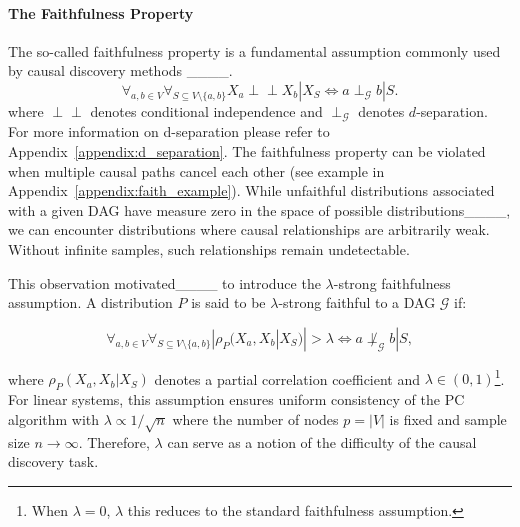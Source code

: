 \paragraph{The Faithfulness Property} 
The so-called faithfulness property is a fundamental assumption commonly used by causal discovery methods ____. 
\begin{equation}
    \forall_{a,b \in V} \forall_{S \subseteq V \setminus \{a ,b\}}X_a \perp\!\!\!\perp X_b | X_S \iff a \perp_\mathcal{G} b | S.
\end{equation}
where  $\perp\!\!\!\perp$ denotes conditional independence and $\perp_\mathcal{G}$ denotes $d$-separation. For more information on d-separation please refer to Appendix~\ref{appendix:d_separation}.
The faithfulness property can be violated when multiple causal paths cancel each other (see example in Appendix~\ref{appendix:faith_example}). While unfaithful distributions associated with a given DAG have measure zero in the space of possible distributions____, we can encounter distributions where causal relationships are arbitrarily weak. Without infinite samples, such relationships remain undetectable. 

This observation motivated____ to introduce the $\lambda$-strong faithfulness assumption. %
A distribution $P$ is said to be $\lambda$-strong faithful to a DAG $\mathcal{G}$ if:

\begin{equation}\label{eq:lambda_faith}
    \forall_{a,b \in V} \forall_{S \subseteq V \setminus \{a ,b\}} |\rho_P(X_a, X_b | X_S)| > \lambda \iff a \not\perp_\mathcal{G} b | S,
\end{equation}

where $\rho_P(X_a, X_b | X_S)$ denotes a partial  correlation coefficient and $\lambda \in (0,1)$\footnote{When $\lambda=0$, $\lambda$ this reduces to the standard faithfulness assumption.}.  For linear systems, this assumption ensures uniform consistency of the PC algorithm with $\lambda \propto 1 / \sqrt{n}$ where the number of nodes $p = |V|$ is fixed and sample size $n \rightarrow \infty.$ Therefore, $\lambda$ can serve as a notion of the difficulty of the causal discovery task. 

